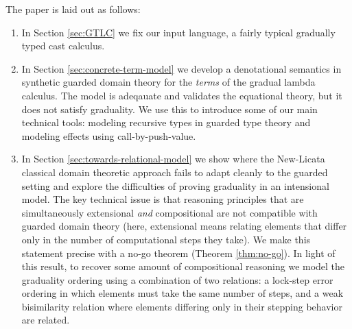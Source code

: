 The paper is laid out as follows:
\begin{enumerate}
\item In Section \ref{sec:GTLC} we fix our input language, a fairly
  typical gradually typed cast calculus.
\item In Section \ref{sec:concrete-term-model} we develop a
  denotational semantics in synthetic guarded domain theory for the
  \emph{terms} of the gradual lambda calculus.  The model is adeqauate
  and validates the equational theory, but it does not satisfy
  graduality. We use this to introduce some of our main technical
  tools: modeling recursive types in guarded type theory and modeling
  effects using call-by-push-value.
\item In Section \ref{sec:towards-relational-model} we show where the
  New-Licata classical domain theoretic approach fails to adapt
  cleanly to the guarded setting and explore the difficulties of
  proving graduality in an intensional model.
  The key technical issue is that reasoning principles that are simultaneously
  extensional \emph{and} compositional are not compatible with guarded domain
  theory (here, extensional means relating elements that differ only in the
  number of computational steps they take). We make this statement precise with
  a no-go theorem (Theorem \ref{thm:no-go}). In light of this result, to recover
  some amount of compositional reasoning we model the graduality ordering using
  a combination of two relations: a lock-step error ordering in which elements
  must take the same number of steps, and a weak bisimilarity relation where
  elements differing only in their stepping behavior are related.

  

\end{enumerate}
